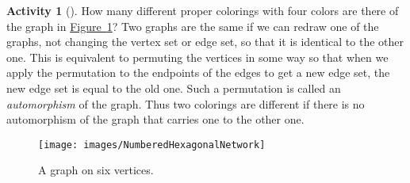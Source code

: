 \documentclass[10pt,]{book}
\theoremstyle{plain}
\theoremstyle{definition}
\newtheorem{activity}[project]{Activity}
\numberwithin{equation}{chapter}
\begin{document}
\begin{activity}[]\label{activity-303}
How many different proper colorings with four colors are there of the graph in \hyperref[starhexagon]{Figure~\ref{starhexagon}}? Two graphs are the same if we can redraw one of the graphs, not changing the vertex set or edge set, so that it is identical to the other one. This is equivalent to permuting the vertices in some way so that when we apply the permutation to the endpoints of the edges to get a new edge set, the new edge set is equal to the old one. Such a permutation is called an \emph{automorphism} of the graph. Thus two colorings are different if there is no automorphism of the graph that carries one to the other one.%
\begin{figure}
\centering
\texttt{[image: images/NumberedHexagonalNetwork]}
\caption{A graph on six vertices.\label{starhexagon}}
\end{figure}
\par\medskip\noindent%

\end{activity}
\end{document}
